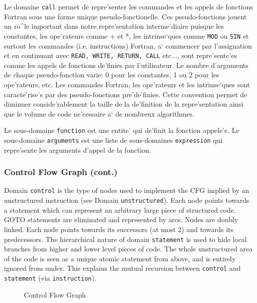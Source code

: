 {Le domaine \verb/call/ permet de repre'senter les commandes et les
appels de fonctions Fortran sous une forme unique pseudo-fonctionelle.
Ces pseudo-fonctions jouent un ro^le important dans notre
repre'sentation interme'diaire puisque les constantes, les ope'rateurs
comme + et *, les intrinse`ques comme {\tt MOD} ou {\tt SIN} et surtout
les commandes (i.e. instructions) Fortran, a` commencer par
l'assignation et en continuant avec {\tt READ, WRITE, RETURN, CALL}
etc..., sont repre'sente'es comme les appels de fonctions de'finies par
l'utilisateur. Le nombre d'arguments de chaque pseudo-fonction varie: 0
pour les constantes, 1 ou 2 pour les ope'rateurs, etc. Les commandes
Fortran, les ope'rateurs et les intrinse`ques sont caracte'rise's par
des pseudo-fonctions pre'de'finies. Cette convention permet de diminuer
conside'rablement la taille de la de'finition de la repre'sentation
ainsi que le volume de code ne'cessaire a` de nombreux algorithmes.

Le sous-domaine \verb/function/ est une entite' qui de'finit la fonction
appele'e. Le sous-domaine \verb/arguments/ est une liste de sous-domaines
\verb/expression/ qui repre'sente les arguments d'appel de la fonction.

\subsubsection{Control Flow Graph (cont.)}
\label{subsubsection-control}

{}


Domain \verb/control/ is the type of nodes used to implement the CFG
implied by an unstructured instruction (see Domain
\verb/unstructured/). Each node points towards a statement which can
represent an arbitrary large piece of structured code. GOTO statements
are eliminated and represented by arcs. Nodes are doubly linked. Each
node points towards its successors (at most 2) and towards its
predecessors. The hierarchical nature of
domain \verb/statement/ is used to hide local branches from higher and
lower level pieces of code. The whole unstructured area of the code is
seen as a unique atomic statement from above, and is entirely ignored
from under. This explains the mutual recursion between \verb/control/
and \verb/statement/ (via \verb/instruction/).

\begin{figure}
\begin{center}
\mbox{}
\end{center}
\caption{Control Flow Graph}
\label{figure-unstructured}
\end{figure}

}
